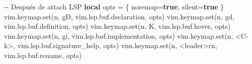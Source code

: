 \documentclass[
  doc,
  floatsintext,
  longtable,
  a4paper,
  nolmodern,
  notxfonts,
  notimes,
  12pt,
  colorlinks=true,linkcolor=blue,citecolor=blue,urlcolor=blue]{apa7}
\newenvironment{Shaded}{\begin{snugshade}}{\end{snugshade}}
\newcommand{\CommentTok}[1]{\textcolor[rgb]{0.37,0.37,0.37}{#1}}
\newcommand{\KeywordTok}[1]{\textcolor[rgb]{0.00,0.23,0.31}{\textbf{#1}}}
\newcommand{\NormalTok}[1]{\textcolor[rgb]{0.00,0.23,0.31}{#1}}
\newcommand{\OperatorTok}[1]{\textcolor[rgb]{0.37,0.37,0.37}{#1}}
\newcommand{\StringTok}[1]{\textcolor[rgb]{0.13,0.47,0.30}{#1}}
\newcommand{\VariableTok}[1]{\textcolor[rgb]{0.07,0.07,0.07}{#1}}
\begin{document}
\begin{Shaded}
\begin{Highlighting}[]
\CommentTok{{-}{-} Después de attach LSP}
\KeywordTok{local} \VariableTok{opts} \OperatorTok{=} \OperatorTok{\{} \VariableTok{noremap}\OperatorTok{=}\KeywordTok{true}\OperatorTok{,} \VariableTok{silent}\OperatorTok{=}\KeywordTok{true} \OperatorTok{\}}
\VariableTok{vim}\OperatorTok{.}\VariableTok{keymap}\OperatorTok{.}\NormalTok{set}\OperatorTok{(}\StringTok{\textquotesingle{}n\textquotesingle{}}\OperatorTok{,} \StringTok{\textquotesingle{}gD\textquotesingle{}}\OperatorTok{,} \VariableTok{vim}\OperatorTok{.}\VariableTok{lsp}\OperatorTok{.}\VariableTok{buf}\OperatorTok{.}\VariableTok{declaration}\OperatorTok{,} \VariableTok{opts}\OperatorTok{)}
\VariableTok{vim}\OperatorTok{.}\VariableTok{keymap}\OperatorTok{.}\NormalTok{set}\OperatorTok{(}\StringTok{\textquotesingle{}n\textquotesingle{}}\OperatorTok{,} \StringTok{\textquotesingle{}gd\textquotesingle{}}\OperatorTok{,} \VariableTok{vim}\OperatorTok{.}\VariableTok{lsp}\OperatorTok{.}\VariableTok{buf}\OperatorTok{.}\VariableTok{definition}\OperatorTok{,} \VariableTok{opts}\OperatorTok{)}
\VariableTok{vim}\OperatorTok{.}\VariableTok{keymap}\OperatorTok{.}\NormalTok{set}\OperatorTok{(}\StringTok{\textquotesingle{}n\textquotesingle{}}\OperatorTok{,} \StringTok{\textquotesingle{}K\textquotesingle{}}\OperatorTok{,} \VariableTok{vim}\OperatorTok{.}\VariableTok{lsp}\OperatorTok{.}\VariableTok{buf}\OperatorTok{.}\VariableTok{hover}\OperatorTok{,} \VariableTok{opts}\OperatorTok{)}
\VariableTok{vim}\OperatorTok{.}\VariableTok{keymap}\OperatorTok{.}\NormalTok{set}\OperatorTok{(}\StringTok{\textquotesingle{}n\textquotesingle{}}\OperatorTok{,} \StringTok{\textquotesingle{}gi\textquotesingle{}}\OperatorTok{,} \VariableTok{vim}\OperatorTok{.}\VariableTok{lsp}\OperatorTok{.}\VariableTok{buf}\OperatorTok{.}\VariableTok{implementation}\OperatorTok{,} \VariableTok{opts}\OperatorTok{)}
\VariableTok{vim}\OperatorTok{.}\VariableTok{keymap}\OperatorTok{.}\NormalTok{set}\OperatorTok{(}\StringTok{\textquotesingle{}n\textquotesingle{}}\OperatorTok{,} \StringTok{\textquotesingle{}\textless{}C{-}k\textgreater{}\textquotesingle{}}\OperatorTok{,} \VariableTok{vim}\OperatorTok{.}\VariableTok{lsp}\OperatorTok{.}\VariableTok{buf}\OperatorTok{.}\VariableTok{signature\_help}\OperatorTok{,} \VariableTok{opts}\OperatorTok{)}
\VariableTok{vim}\OperatorTok{.}\VariableTok{keymap}\OperatorTok{.}\NormalTok{set}\OperatorTok{(}\StringTok{\textquotesingle{}n\textquotesingle{}}\OperatorTok{,} \StringTok{\textquotesingle{}\textless{}leader\textgreater{}rn\textquotesingle{}}\OperatorTok{,} \VariableTok{vim}\OperatorTok{.}\VariableTok{lsp}\OperatorTok{.}\VariableTok{buf}\OperatorTok{.}\VariableTok{rename}\OperatorTok{,} \VariableTok{opts}\OperatorTok{)}

\end{Highlighting}
\end{Shaded}
\end{document}
